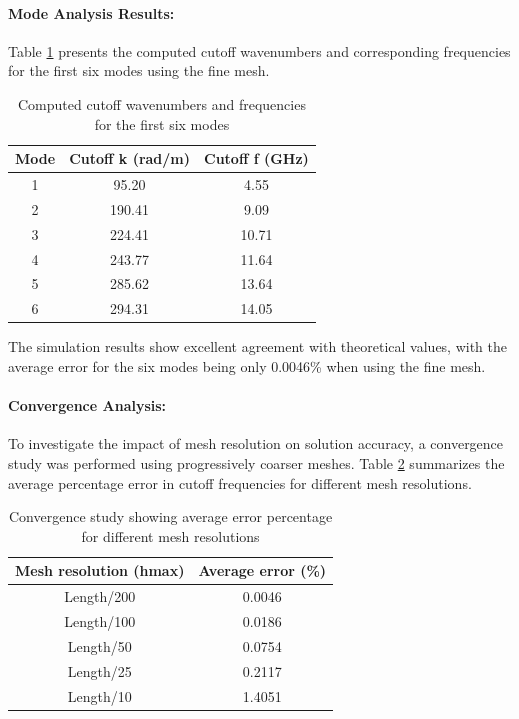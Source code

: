 \documentclass[10pt,letterpaper]{article}
\begin{document}
\paragraph{Mode Analysis Results:}
Table \ref{tab:cutoff_freq} presents the computed cutoff wavenumbers and corresponding frequencies for the first six modes using the fine mesh.

\begin{table}[htbp]
    \centering
    \caption{Computed cutoff wavenumbers and frequencies for the first six modes}
    \begin{tabular}{ccc}
    \hline
    Mode & Cutoff k (rad/m) & Cutoff f (GHz) \\
    \hline
     1   &      95.20      &      4.55     \\
     2   &     190.41      &      9.09     \\
     3   &     224.41      &     10.71     \\
     4   &     243.77      &     11.64     \\
     5   &     285.62      &     13.64     \\
     6   &     294.31      &     14.05     \\
    \hline
    \end{tabular}
    \label{tab:cutoff_freq}
\end{table}

The simulation results show excellent agreement with theoretical values, with the average error for the six modes being only 0.0046\% when using the fine mesh. 

\paragraph{Convergence Analysis:}
To investigate the impact of mesh resolution on solution accuracy, a convergence study was performed using progressively coarser meshes. Table \ref{tab:convergence} summarizes the average percentage error in cutoff frequencies for different mesh resolutions.

\begin{table}[htbp]
    \centering
    \caption{Convergence study showing average error percentage for different mesh resolutions}
    \begin{tabular}{cc}
    \hline
    Mesh resolution (hmax) & Average error (\%) \\
    \hline
    Length/200 & 0.0046 \\
    Length/100 & 0.0186 \\
    Length/50  & 0.0754 \\
    Length/25  & 0.2117 \\
    Length/10  & 1.4051 \\
    \hline
    \end{tabular}
    \label{tab:convergence}
\end{table}
\end{document}

